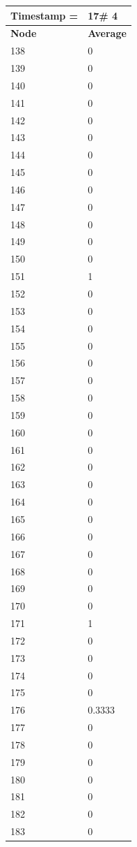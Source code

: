 \begin{tabular}{|l||l|}
\hline
\textbf{Timestamp =} & \textbf{17}\# 4\\\hline
	\textbf{Node} & \textbf{Average} \\ \hline
\hline
	138 & 0 \\ \hline
	139 & 0 \\ \hline
	140 & 0 \\ \hline
	141 & 0 \\ \hline
	142 & 0 \\ \hline
	143 & 0 \\ \hline
	144 & 0 \\ \hline
	145 & 0 \\ \hline
	146 & 0 \\ \hline
	147 & 0 \\ \hline
	148 & 0 \\ \hline
	149 & 0 \\ \hline
	150 & 0 \\ \hline
	151 & 1 \\ \hline
	152 & 0 \\ \hline
	153 & 0 \\ \hline
	154 & 0 \\ \hline
	155 & 0 \\ \hline
	156 & 0 \\ \hline
	157 & 0 \\ \hline
	158 & 0 \\ \hline
	159 & 0 \\ \hline
	160 & 0 \\ \hline
	161 & 0 \\ \hline
	162 & 0 \\ \hline
	163 & 0 \\ \hline
	164 & 0 \\ \hline
	165 & 0 \\ \hline
	166 & 0 \\ \hline
	167 & 0 \\ \hline
	168 & 0 \\ \hline
	169 & 0 \\ \hline
	170 & 0 \\ \hline
	171 & 1 \\ \hline
	172 & 0 \\ \hline
	173 & 0 \\ \hline
	174 & 0 \\ \hline
	175 & 0 \\ \hline
	176 & 0.3333 \\ \hline
	177 & 0 \\ \hline
	178 & 0 \\ \hline
	179 & 0 \\ \hline
	180 & 0 \\ \hline
	181 & 0 \\ \hline
	182 & 0 \\ \hline
	183 & 0 \\ \hline
\end{tabular}
